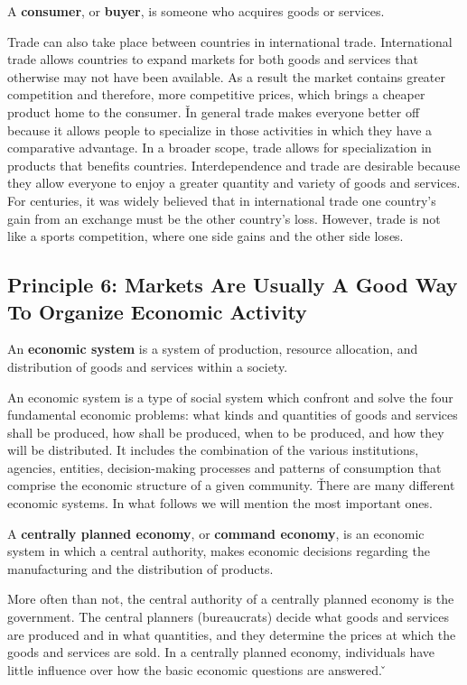A \textbf{consumer}, or \textbf{buyer}, is someone who acquires goods or services.
\ed

Trade can also take place between countries in international trade. International trade allows countries to expand
markets for both goods and services that otherwise may not have been available. As a result the market contains
greater competition and therefore, more competitive prices, which brings a cheaper product home to the consumer. \v

In general trade makes everyone better off because it allows people to specialize in those activities in which they
have a comparative advantage. In a broader scope, trade allows for specialization in products that benefits countries.
Interdependence and trade are desirable because they allow everyone to enjoy a greater quantity and variety of
goods and services. For centuries, it was widely believed that in international trade one country's gain from an
exchange must be the other country's loss. However, trade is not like a sports competition, where one side gains and
the other side loses.

\subsection*{Principle 6: Markets Are Usually A Good Way To Organize Economic Activity}

An \textbf{economic system} is a system of production, resource allocation, and distribution of goods and services
within a society.
\ed

An economic system is a type of social system which confront and solve the four fundamental economic problems: what
kinds and quantities of goods and services shall be produced, how shall be produced, when to be produced, and how
they will be distributed. It includes the combination of the various institutions, agencies, entities, decision-making
processes and patterns of consumption that comprise the economic structure of a given community. \v

There are many different economic systems. In what follows we will mention the most important ones.

A \textbf{centrally planned economy}, or \textbf{command economy}, is an economic system in which a central authority,
makes economic decisions regarding the manufacturing and the distribution of products.
\ed

More often than not, the central authority of a centrally planned economy is the government. The central planners
(bureaucrats) decide what goods and services are produced and in what quantities, and they determine the prices at
which the goods and services are sold. In a centrally planned economy, individuals have little influence over how the
basic economic questions are answered. \v


